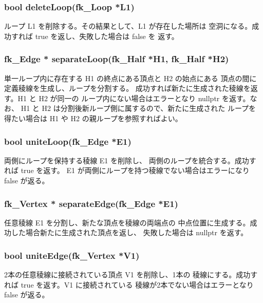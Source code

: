  \subsubsection*{\hspace*{0.6cm}bool deleteLoop(fk\_Loop *L1)}
	ループ L1 を削除する。その結果として、L1 が存在した場所は
	空洞になる。成功すれば true を返し、失敗した場合は false を
	返す。


 \subsubsection*{\hspace*{0.6cm}fk\_Edge *
	separateLoop(fk\_Half *H1, fk\_Half *H2)}
	単一ループ内に存在する H1 の終点にある頂点と H2 の始点にある
	頂点の間に定義稜線を生成し、ループを分割する。
	成功すれば新たに生成された稜線を返す。H1 と H2 が同一の
	ループ内にない場合はエラーとなり nullptr を返す。なお、
	H1 と H2 は分割後新ループ側に属するので、新たに生成された
	ループを得たい場合は H1 や H2 の親ループを参照すればよい。

 \subsubsection*{\hspace*{0.6cm}bool uniteLoop(fk\_Edge *E1)}
	両側にループを保持する稜線 E1 を削除し、
	両側のループを統合する。成功すれば true を返す。
	E1 が両側にループを持つ稜線でない場合はエラーになり false が返る。


 \subsubsection*{\hspace*{0.6cm}fk\_Vertex * separateEdge(fk\_Edge *E1)}
	任意稜線 E1 を分割し、新たな頂点を稜線の両端点の
	中点位置に生成する。成功した場合新たに生成された頂点を返し、
	失敗した場合は nullptr を返す。

 \subsubsection*{\hspace*{0.6cm}bool uniteEdge(fk\_Vertex *V1)}
	2本の任意稜線に接続されている頂点 V1 を削除し、1本の
	稜線にする。成功すれば true を返す。V1 に接続されている
	稜線が2本でない場合はエラーとなり false が返る。

